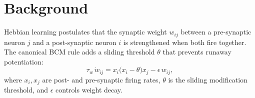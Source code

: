 \section{Background}

Hebbian learning \cite{bienenstock1982} postulates that the synaptic weight $w_{ij}$
between a pre-synaptic neuron $j$ and a post-synaptic neuron $i$ is strengthened when
both fire together.  The canonical BCM rule adds a sliding threshold $\theta$ that
prevents runaway potentiation:
\begin{equation}
  \tau_w\,\dot{w}_{ij} = x_i\bigl(x_i - \theta\bigr)x_j - \epsilon\,w_{ij},
  \label{eq:bcm}
\end{equation}
where $x_i,x_j$ are post- and pre-synaptic firing rates, $\theta$ is the sliding
modification threshold, and $\epsilon$ controls weight decay.
